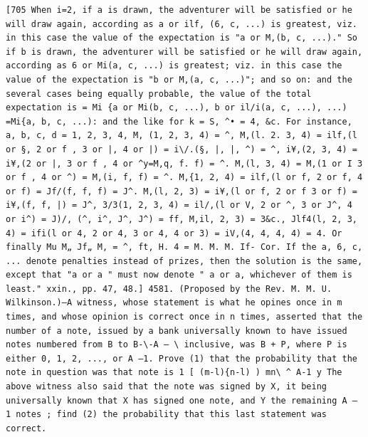 \documentclass[12pt]{article}
\theoremstyle{plain}
\begin{document}
\newpage
\setcounter{page}{588}
\begin{verbatim}
[705 When i=2, if a is drawn, the adventurer will be satisfied or he will draw again, according as a or ilf, (6, c, ...) is greatest, viz. in this case the value of the expectation is "a or M,(b, c, ...)." So if b is drawn, the adventurer will be satisfied or he will draw again, according as 6 or Mi(a, c, ...) is greatest; viz. in this case the value of the expectation is "b or M,(a, c, ...)"; and so on: and the several cases being equally probable, the value of the total expectation is = Mi {a or Mi(b, c, ...), b or il/i(a, c, ...), ...) =Mi{a, b, c, ...): and the like for k = S, ^• = 4, &c. For instance, a, b, c, d = 1, 2, 3, 4, M, (1, 2, 3, 4) = ^, M,(l. 2. 3, 4) = ilf,(l or §, 2 or f , 3 or |, 4 or |) = i\/.(§, |, |, ^) = ^, i¥,(2, 3, 4) = i¥,(2 or |, 3 or f , 4 or ^y=M,q, f. f) = ^. M,(l, 3, 4) = M,(1 or I 3 or f , 4 or ^) = M,(i, f, f) = ^. M,{1, 2, 4) = ilf,(l or f, 2 or f, 4 or f) = Jf/(f, f, f) = J^. M,(l, 2, 3) = i¥,(l or f, 2 or f 3 or f) = i¥,(f, f, |) = J^, 3/3(1, 2, 3, 4) = il/,(l or V, 2 or ^, 3 or J^, 4 or i^) = J)/, (^, i^, J^, J^) = ff, M,il, 2, 3) = 3&c., Jlf4(l, 2, 3, 4) = ifi(l or 4, 2 or 4, 3 or 4, 4 or 3) = iV,(4, 4, 4, 4) = 4. Or finally Mu M„ Jf„ M, = ^, ft, H. 4 = M. M. M. If- Cor. If the a, 6, c, ... denote penalties instead of prizes, then the solution is the same, except that "a or a " must now denote " a or a, whichever of them is least." xxin., pp. 47, 48.] 4581. (Proposed by the Rev. M. M. U. Wilkinson.)—A witness, whose statement is what he opines once in m times, and whose opinion is correct once in n times, asserted that the number of a note, issued by a bank universally known to have issued notes numbered from B to B-\-A — \ inclusive, was B + P, where P is either 0, 1, 2, ..., or A —1. Prove (1) that the probability that the note in question was that note is 1 [ (m-l){n-l) ) mn\ ^ A-1 y The above witness also said that the note was signed by X, it being universally known that X has signed one note, and Y the remaining A — 1 notes ; find (2) the probability that this last statement was correct. 
\end{verbatim}
\end{document}
